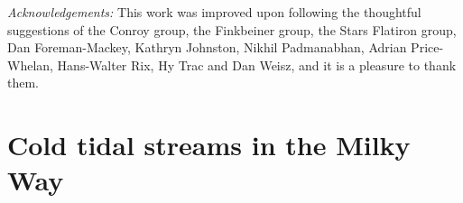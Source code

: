 \documentclass[modern]{aastex61}
\begin{document}






\emph{Acknowledgements:} This work was improved upon following the thoughtful suggestions of the Conroy group, the Finkbeiner group, the Stars Flatiron group, Dan Foreman-Mackey, Kathryn Johnston, Nikhil Padmanabhan, Adrian Price-Whelan, Hans-Walter Rix, Hy Trac and Dan Weisz, and it is a pleasure to thank them.




\appendix
\section{Cold tidal streams in the Milky Way}
\label{sec:streams}
\end{document}
